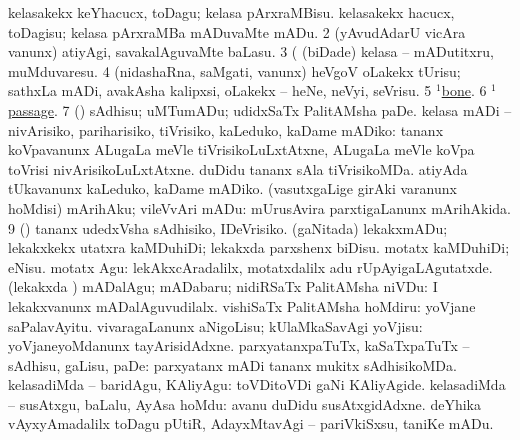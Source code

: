 \begin{center}
\noindent
\gl{\pagu}
\expl{}
\bmng
\bnum
{}  
\banum
{} kelasakekx keYhacucx, toDagu; kelasa pArxraMBisu. 
 kelasakekx hacucx, toDagisu; kelasa pArxraMBa mADuvaMte mADu. 
\eanum
\numie
\num{2}  (yAvudAdarU vicAra \mo vanunx) atiyAgi, savakalAguvaMte baLasu. 
\num{3}  (  (biDade) kelasa -- mADutitxru, muMduvaresu. 
\num{4}  (nidashaRna, saMgati, \mo vanunx) heVgoV oLakekx tUrisu; sathxLa mADi, avakAsha kalipxsi, oLakekx -- heNe, neVyi, seVrisu. 
\num{5}  \hyperref{kandict_b.pdf}{B}{bone(1) nuga(13)}{$^1$bone}. 
\num{6}  \hyperref{kandict_p.pdf}{P}{passage(1) pagu(2)}{$^1$passage}. 
\num{7}  (\AmA) sAdhisu; uMTumADu; udidxSaTx PalitAMsha paDe. 
  
\banum
{} kelasa mADi -- nivArisiko, pariharisiko, tiVrisiko, kaLeduko, kaDame mADiko:  tananx koVpavanunx ALugaLa meVle tiVrisikoLuLxtAtxne, ALugaLa meVle koVpa toVrisi nivArisikoLuLxtAtxne.  duDidu tananx sAla tiVrisikoMDa.  atiyAda tUkavanunx kaLeduko, kaDame mADiko. 
 (vasutxgaLige girAki \mo varanunx hoMdisi) mArihAku; vileVvAri mADu:    mUrusAvira parxtigaLanunx mArihAkida. 
\eanum
\numie
\num{9}  (\AmA) tananx udedxVsha sAdhisiko, IDeVrisiko. 
  
\banum
{} (gaNitada) lekakxmADu; lekakxkekx utatxra kaMDuhiDi; lekakxda parxshenx biDisu. 
 motatx kaMDuhiDi; eNisu. 
 motatx Agu:  lekAkxcAradalilx, motatxdalilx adu  rUpAyigaLAgutatxde. 
 (lekakxda \vi) mADalAgu; mADabaru; nidiRSaTx PalitAMsha niVDu:  I lekakxvanunx mADalAguvudilalx. 
 vishiSaTx PalitAMsha hoMdiru:  yoVjane saPalavAyitu. 
 vivaragaLanunx aNigoLisu; kUlaMkaSavAgi yoVjisu:  yoVjaneyoMdanunx tayArisidAdxne. 
 parxyatanxpaTuTx, kaSaTxpaTuTx -- sAdhisu, gaLisu, paDe:  parxyatanx mADi tananx mukitx sAdhisikoMDa. 
 kelasadiMda -- baridAgu, KAliyAgu:  toVDitoVDi gaNi KAliyAgide. 
 kelasadiMda -- susAtxgu, baLalu, AyAsa hoMdu:  avanu duDidu susAtxgidAdxne. 
 deYhika vAyxyAmadalilx toDagu 
\eanum
\numie
{}  
\banum
{} pUtiR, AdayxMtavAgi -- pariVkiSxsu, taniKe mADu. 

\end{center}
